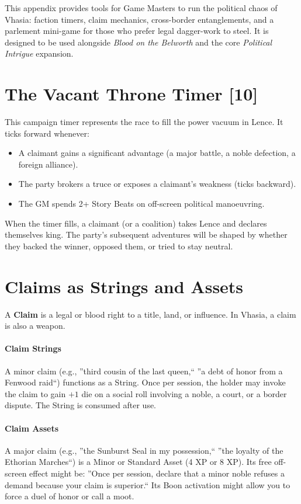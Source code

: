 \documentclass[11pt,twoside]{book}
\begin{document}
This appendix provides tools for Game Masters to run the political chaos of Vhasia: faction timers, claim mechanics, cross-border entanglements, and a parlement mini-game for those who prefer legal dagger-work to steel. It is designed to be used alongside \textit{Blood on the Belworth} and the core \textit{Political Intrigue} expansion.

\section*{The Vacant Throne Timer [10]}

This campaign timer represents the race to fill the power vacuum in Lence. It ticks forward whenever:

\begin{itemize}
    \item A claimant gains a significant advantage (a major battle, a noble defection, a foreign alliance).
    \item The party brokers a truce or exposes a claimant's weakness (ticks backward).
    \item The GM spends 2+ Story Beats on off-screen political manoeuvring.
\end{itemize}

When the timer fills, a claimant (or a coalition) takes Lence and declares themselves king. The party's subsequent adventures will be shaped by whether they backed the winner, opposed them, or tried to stay neutral.

\section*{Claims as Strings and Assets}

A \textbf{Claim} is a legal or blood right to a title, land, or influence. In Vhasia, a claim is also a weapon.

\paragraph{Claim Strings}
A minor claim (e.g., ''third cousin of the last queen,`` ''a debt of honor from a Fenwood raid``) functions as a String. Once per session, the holder may invoke the claim to gain \(+1\) die on a social roll involving a noble, a court, or a border dispute. The String is consumed after use.

\paragraph{Claim Assets}
A major claim (e.g., ''the Sunburst Seal in my possession,`` ''the loyalty of the Ethorian Marches``) is a Minor or Standard Asset (4 XP or 8 XP). Its free off-screen effect might be: ''Once per session, declare that a minor noble refuses a demand because your claim is superior.`` Its Boon activation might allow you to force a duel of honor or call a moot.
\end{document}

